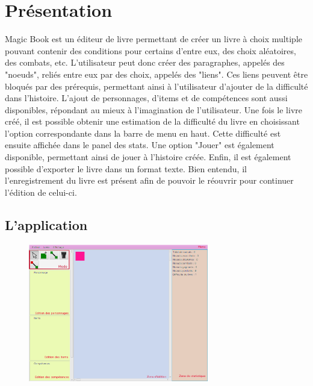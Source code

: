\chapter{Présentation}

        Magic Book est un éditeur de livre permettant de créer un livre à choix multiple pouvant contenir des conditions pour certains d'entre eux, des choix aléatoires, des combats, etc. L'utilisateur peut donc créer des paragraphes, appelés des "noeuds", reliés entre eux par des choix, appelés des "liens". Ces liens peuvent être bloqués par des prérequis, permettant ainsi à l'utilisateur d'ajouter de la difficulté dans l'histoire. L'ajout de personnages, d'items et de compétences sont aussi disponibles, répondant au mieux à l'imagination de l'utilisateur. Une fois le livre créé, il est possible obtenir une estimation de la difficulté du livre en choisissant l'option correspondante dans la barre de menu en haut. Cette difficulté est ensuite affichée dans le panel des stats. Une option "Jouer" est également disponible, permettant ainsi de jouer à l'histoire créée. Enfin, il est également possible d'exporter le livre dans un format texte. Bien entendu, il l'enregistrement du livre est présent afin de pouvoir le réouvrir pour continuer l'édition de celui-ci.

	\section{L'application}

		\begin{figure}[H]
			\centering\includegraphics[width=0.7\textwidth, keepaspectratio]{img/magicBook.png}
		\end{figure}

